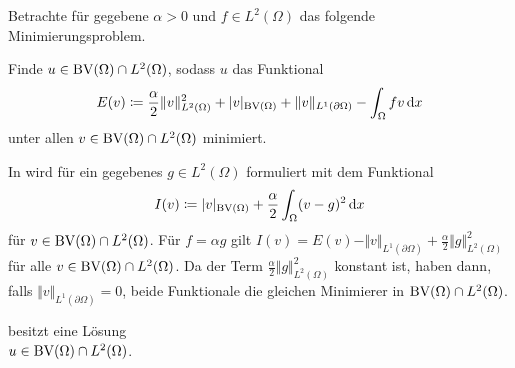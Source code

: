 Betrachte für gegebene $\alpha>0$ und $f\in L^2(\Omega)$ das 
folgende Minimierungsproblem. 

\begin{problem}\label{prob:continuousProblem}
  Finde $u\in \textup{BV}(\Omega)\cap L^2(\Omega)$, sodass
  $u$ das Funktional
  \begin{align}\label{eq:continuousProblem}
    E(v)\coloneqq \frac{\alpha}{2}\Vert v\Vert_{L^2(\Omega)}^2 + |v|_{\textup{BV}(\Omega)}
    +\Vert v\Vert_{L^1(\partial\Omega)}-\int_\Omega fv\,\mathrm{d}x
  \end{align}
  unter allen $v\in\textup{BV}(\Omega)\cap L^2(\Omega)$ minimiert.
\end{problem}

\begin{remark}
  In \cite[Kapitel~10.1.3]{Bar15} wird  für ein
  gegebenes $g\in L^2(\Omega)$ formuliert
  mit dem Funktional 
  \begin{align*}
    I(v)\coloneqq |v|_{\textup{BV}(\Omega)} + \frac{\alpha}{2}\int_\Omega (v-g)^2\,\mathrm{d}x
  \end{align*}
  für $v\in \textup{BV}(\Omega)\cap L^2(\Omega)$.
  Für $f = \alpha g$ gilt
  $I(v) = E(v) - \Vert v\Vert_{L^1(\partial \Omega)}+ 
  \frac{\alpha}{2}\Vert g\Vert_{L^2(\Omega)}^2$ für alle 
  $v\in \textup{BV}(\Omega)\cap L^2(\Omega)$. Da der Term $\frac{\alpha}{2}\Vert
  g\Vert_{L^2(\Omega)}^2$ konstant ist, haben dann, falls $\Vert
  v\Vert_{L^1(\partial\Omega)} = 0$, beide Funktionale die
  gleichen Minimierer in $\textup{BV}(\Omega)\cap L^2(\Omega)$.
\end{remark}

\begin{theorem}
  \label{thm:contProblemExistence}
   besitzt eine Lösung \\$u\in\textup{BV}(\Omega)\cap
  L^2(\Omega)$.
\end{theorem}

